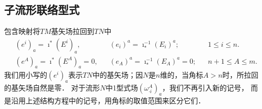 \subsection{子流形联络型式}
包含映射将$TM$基矢场拉回到$TN$中
\begin{subequations}\label{chsm:eqn_base-tmp1}
\begin{align}
    &(e^i)_a = \imath^* (E^i)_a, &{}& (e_i)^a = \imath_*^{-1} (E_i)^a; &{}&  1 \leqslant i \leqslant n. \\
    &(e^A)_a = \imath^* (E^A)_a=0, &{}&  (e_A)^a = \imath_*^{-1} (E_A)^a=0;&{}&
    n+1 \leqslant A \leqslant m. 
\end{align}
\end{subequations}
我们用小写的$(e^i)_a$表示$TN$中的基矢场；因$N$是$n$维的，当角标$A>n$时，所拉回的基矢场自然是零．
对于流形$N$中1型式场$(\omega _{\cdot i}^A)_a$，我们不再引入新的记号，
而是沿用上述结构方程中的记号，用角标的取值范围来区分它们．


